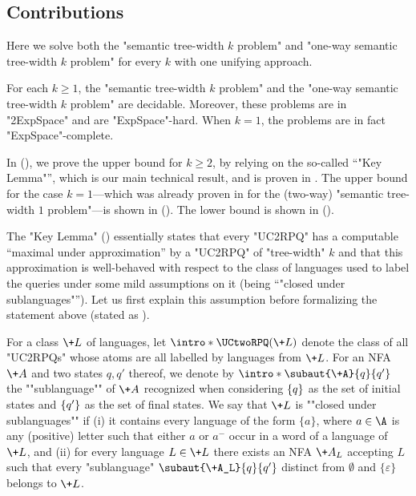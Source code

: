 \subsection{\AP{}Contributions}
Here we solve both the "semantic tree-width $k$ problem" and "one-way semantic tree-width $k$ problem" for every $k$ with one unifying approach.
\begin{theorem}
    \AP\label{thm:decidability-semtw}
    For each $k \geq 1$, the "semantic tree-width $k$ problem" and the "one-way semantic tree-width $k$ problem" are decidable. Moreover, these problems are in "2ExpSpace" and are "ExpSpace"-hard.
	When $k=1$, the problems are in fact "ExpSpace"-complete.
\end{theorem}
In  (),
we prove the upper bound for $k\geq 2$, by relying on the so-called ``"Key Lemma"'', which is our main technical result, and is proven in .
The upper bound for the case $k=1$---which was already proven in \cite{BarceloRV16} for the (two-way) "semantic tree-width $1$ problem"---is shown in  (). The lower bound is shown in  ().

The "Key Lemma" () essentially states that
every "UC2RPQ" has a computable ``maximal under approximation'' by a "UC2RPQ" of "tree-width" $k$ and that this approximation is well-behaved with respect to the class of languages used to label the queries under some mild assumptions on it (being ``"closed under sublanguages"''). Let us first
explain this assumption before formalizing the statement above (stated as ).

For a class $\+L$ of languages, let $\intro*\UCtwoRPQ(\+L)$ denote the class of all "UC2RPQs" whose atoms are all labelled by languages from $\+L$.
\AP For an NFA $\+A$ and two states $q,q'$ thereof, we denote by $\intro*\subaut{\+A}{q}{q'}$ the ""sublanguage"" of $\+A$ recognized  when considering $\{q\}$ as the set of initial states and $\{q'\}$ as the set of final states.
\AP We say that $\+L$ is ""closed under sublanguages"" if
(i) it contains every language of the form $\{a\}$,
where $a \in \A$ is any (positive) letter such that either $a$ or $a^-$ occur in a word of a
language of $\+L$, and (ii) for every language $L \in \+L$ there exists an NFA $\+A_L$ accepting $L$ such that every "sublanguage" $\subaut{\+A_L}{q}{q'}$ distinct from $\emptyset$ and
$\{\varepsilon\}$ belongs to $\+L$.

